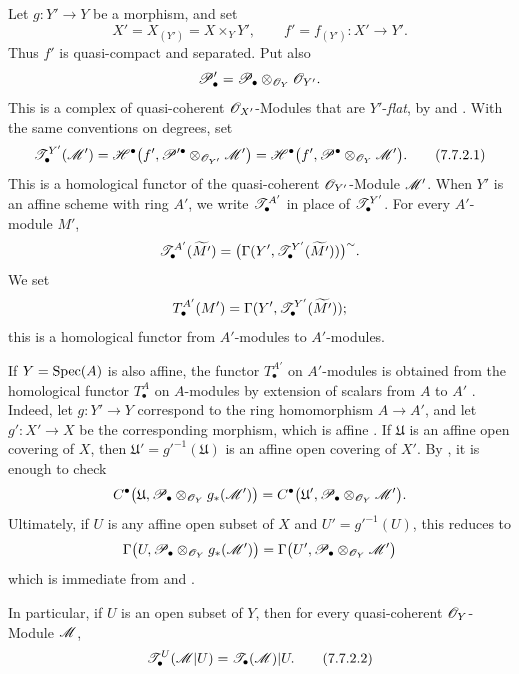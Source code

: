 \begin{env}[7.7.2]
\label{III.7.7.2}
Let $g:Y'\to Y$ be a morphism, and set
\[
  X'=X_{(Y')}=X\times_Y Y',
  \qquad
  f'=f_{(Y')}:X'\longrightarrow Y'.
\]
Thus $f'$ is quasi-compact and separated.  Put also
\[
  \mathscr{P}'_\bullet
  =\mathscr{P}_\bullet\otimes_{\mathscr{O}_Y}\mathscr{O}_{Y'}.
\]
This is a complex of quasi-coherent $\mathscr{O}_{X'}$-Modules
that are $Y'$-\emph{flat}, by  and
.  With the same conventions on degrees, set
\[
  \mathscr{T}^{Y'}_\bullet(\mathscr{M}')
  =
  \mathscr{H}^\bullet
    \bigl(f',
      \mathscr{P}'^\bullet\otimes_{\mathscr{O}_{Y'}}\mathscr{M}'\bigr)
  =
  \mathscr{H}^\bullet
    \bigl(f',
      \mathscr{P}^\bullet\otimes_{\mathscr{O}_Y}\mathscr{M}'\bigr).
  \tag{7.7.2.1}\label{III.7.7.2.1}
\]
This is a homological functor of the quasi-coherent
$\mathscr{O}_{Y'}$-Module $\mathscr{M}'$.  When $Y'$ is an affine
scheme with ring $A'$, we write $\mathscr{T}^{A'}_\bullet$ in
place of $\mathscr{T}^{Y'}_\bullet$.  For every $A'$-module $M'$,
\[
  \mathscr{T}^{A'}_\bullet(\widetilde{M'})
  =
  \bigl(
    \Gamma(Y',
      \mathscr{T}^{Y'}_\bullet(\widetilde{M'}))
  \bigr)^\sim.
\]
We set
\[
  T^{A'}_\bullet(M')
  =
  \Gamma(Y',
    \mathscr{T}^{Y'}_\bullet(\widetilde{M'}));
\]
this is a homological functor from $A'$-modules to
$A'$-modules.

If $Y=\operatorname{Spec}(A)$ is also affine, the functor
$T^{A'}_\bullet$ on $A'$-modules is obtained from the
homological functor $T^A_\bullet$ on $A$-modules by extension
of scalars from $A$ to $A'$ .  Indeed, let
$g:Y'\to Y$ correspond to the ring homomorphism $A\to A'$,
and let $g':X'\to X$ be the corresponding morphism, which is
affine .  If $\mathfrak U$ is an affine
open covering of $X$, then
$\mathfrak U'=g'^{-1}(\mathfrak U)$ is an affine open
covering of $X'$.  By , it is enough to check
\[
  C^\bullet
  \bigl(\mathfrak U,
    \mathscr{P}_\bullet\otimes_{\mathscr{O}_Y}g_*(\mathscr{M}')\bigr)
  =
  C^\bullet
  \bigl(\mathfrak U',
    \mathscr{P}_\bullet\otimes_{\mathscr{O}_Y}\mathscr{M}'\bigr).
\]
Ultimately, if $U$ is any affine open subset of $X$ and
$U'=g'^{-1}(U)$, this reduces to
\[
  \Gamma
  \bigl(U,
    \mathscr{P}_\bullet\otimes_{\mathscr{O}_Y}g_*(\mathscr{M}')\bigr)
  =
  \Gamma
  \bigl(U',
    \mathscr{P}_\bullet\otimes_{\mathscr{O}_Y}\mathscr{M}'\bigr)
\]
which is immediate from  and .

In particular, if $U$ is an open subset of $Y$, then for
every quasi-coherent $\mathscr{O}_Y$-Module $\mathscr{M}$,
\[
  \mathscr{T}^U_\bullet(\mathscr{M}|U)
  =
  \mathscr{T}_\bullet(\mathscr{M})|U.
  \tag{7.7.2.2}\label{III.7.7.2.2}
\]
\end{env}

